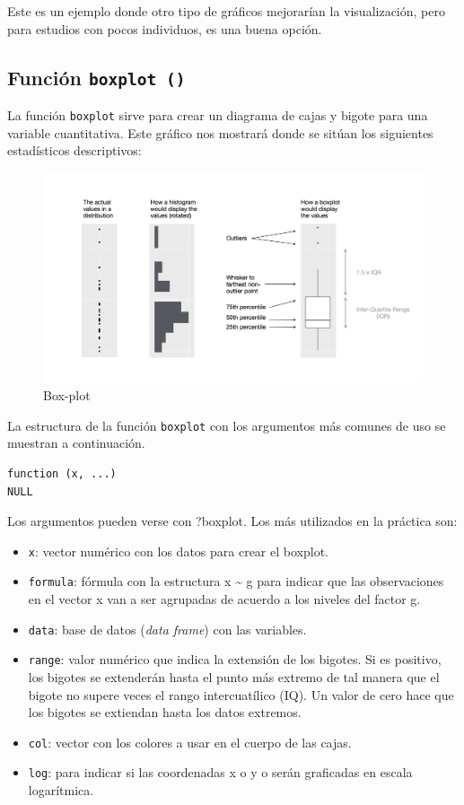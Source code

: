 \documentclass[
]{book}
\providecommand{\tightlist}{%
  \setlength{\itemsep}{0pt}\setlength{\parskip}{0pt}}
\begin{document}
Este es un ejemplo donde otro tipo de gráficos mejorarían la visualización, pero para estudios con pocos individuos, es una buena opción.

\hypertarget{funciuxf3n-boxplot}{%
\subsection{\texorpdfstring{Función \texttt{boxplot\ ()}}{Función boxplot ()}}\label{funciuxf3n-boxplot}}

La función \texttt{boxplot} sirve para crear un diagrama de cajas y bigote para una variable cuantitativa. Este gráfico nos mostrará donde se sitúan los siguientes estadísticos descriptivos:

\begin{figure}
\centering
\includegraphics{figures/EDA-boxplot.png}
\caption{Box-plot}
\end{figure}

La estructura de la función \texttt{boxplot} con los argumentos más comunes de uso se muestran a continuación.

\begin{verbatim}
function (x, ...) 
NULL
\end{verbatim}

Los argumentos pueden verse con ?boxplot. Los más utilizados en la práctica son:

\begin{itemize}
\tightlist
\item
  \texttt{x}: vector numérico con los datos para crear el boxplot.
\item
  \texttt{formula}: fórmula con la estructura x \textasciitilde{} g para indicar que las observaciones en el vector x van a ser agrupadas de acuerdo a los niveles del factor g.
\item
  \texttt{data}: base de datos (\emph{data frame}) con las variables.
\item
  \texttt{range}: valor numérico que indica la extensión de los bigotes. Si es positivo, los bigotes se extenderán hasta el punto más extremo de tal manera que el bigote no supere veces el rango intercuatílico (IQ). Un valor de cero hace que los bigotes se extiendan hasta los datos extremos.
\item
  \texttt{col}: vector con los colores a usar en el cuerpo de las cajas.
\item
  \texttt{log}: para indicar si las coordenadas x o y o serán graficadas en escala logarítmica.
\end{itemize}
\end{document}
